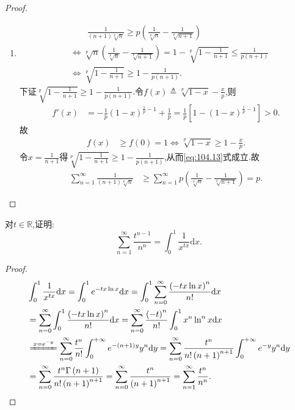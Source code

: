 \documentclass[../../main.tex]{subfiles}
\begin{document}
\begin{proof}
\begin{enumerate}
\item \begin{align}
&\quad \quad \frac{1}{\left( n+1 \right) \sqrt[p]{n}}\geqslant p\left( \frac{1}{\sqrt[p]{n}}-\frac{1}{\sqrt[p]{n+1}} \right) \label{eq:104.13} \\
&\Longleftrightarrow \sqrt[p]{n}\left( \frac{1}{\sqrt[p]{n}}-\frac{1}{\sqrt[p]{n+1}} \right) =1-\sqrt[p]{1-\frac{1}{n+1}}\leqslant \frac{1}{p\left( n+1 \right)}\nonumber \\
&\Longleftrightarrow \sqrt[p]{1-\frac{1}{n+1}}\geqslant 1-\frac{1}{p\left( n+1 \right)}.\nonumber
\end{align}
下证$\sqrt[p]{1-\frac{1}{n+1}}\geqslant 1-\frac{1}{p\left( n+1 \right)}$.令$f\left( x \right) \triangleq \sqrt[p]{1-x}-\frac{x}{p}$,则
\begin{align*}
f\prime \left( x \right) &=-\frac{1}{p}\left( 1-x \right) ^{\frac{1}{p}-1}+\frac{1}{p}=\frac{1}{p}\left[ 1-\left( 1-x \right) ^{\frac{1}{p}-1} \right] >0.
\end{align*}
故
\begin{align*}
f\left( x \right) &\geqslant f\left( 0 \right) =1\Longleftrightarrow \sqrt[p]{1-x}\geqslant 1-\frac{x}{p}.
\end{align*}
令$x=\frac{1}{n+1}$得$\sqrt[p]{1-\frac{1}{n+1}}\geqslant 1-\frac{1}{p\left( n+1 \right)}$,从而\eqref{eq:104.13}式成立.故
\begin{align*}
\sum_{n=1}^{\infty}{\frac{1}{\left( n+1 \right) \sqrt[p]{n}}}&\geqslant \sum_{n=1}^{\infty}{p\left( \frac{1}{\sqrt[p]{n}}-\frac{1}{\sqrt[p]{n+1}} \right)}=p.
\end{align*}
\end{enumerate}

\end{proof}

\begin{example}
对$t \in \mathbb{R}$,证明:
$$\sum_{n=1}^\infty \frac{t^{n-1}}{n^n}=\int_0^1 \frac{1}{x^{tx}}\mathrm{d}x.$$
\end{example}
\begin{proof}
\begin{align*}
&\int_0^1{\frac{1}{x^{tx}}\mathrm{d}x}=\int_0^1{e^{-tx\ln x}\mathrm{d}x}=\int_0^1{\sum_{n=0}^{\infty}{\frac{\left( -tx\ln x \right) ^n}{n!}\mathrm{d}x}}
\\
&=\sum_{n=0}^{\infty}{\int_0^1{\frac{\left( -tx\ln x \right) ^n}{n!}\mathrm{d}x}}=\sum_{n=0}^{\infty}{\frac{\left( -t \right) ^n}{n!}\int_0^1{x^n\ln ^nx\mathrm{d}x}}
\\
&\xlongequal{x=e^{-y}}\sum_{n=0}^{\infty}{\frac{t^n}{n!}\int_0^{+\infty}{e^{-\left( n+1 \right) y}y^n\mathrm{d}y}}=\sum_{n=0}^{\infty}{\frac{t^n}{n!\left( n+1 \right) ^{n+1}}\int_0^{+\infty}{e^{-y}y^n\mathrm{d}y}}
\\
&=\sum_{n=0}^{\infty}{\frac{t^n\Gamma \left( n+1 \right)}{n!\left( n+1 \right) ^{n+1}}}=\sum_{n=0}^{\infty}{\frac{t^n}{\left( n+1 \right) ^{n+1}}}=\sum_{n=1}^{\infty}{\frac{t^n}{n^n}}.
\end{align*}

\end{proof}
\end{document}
